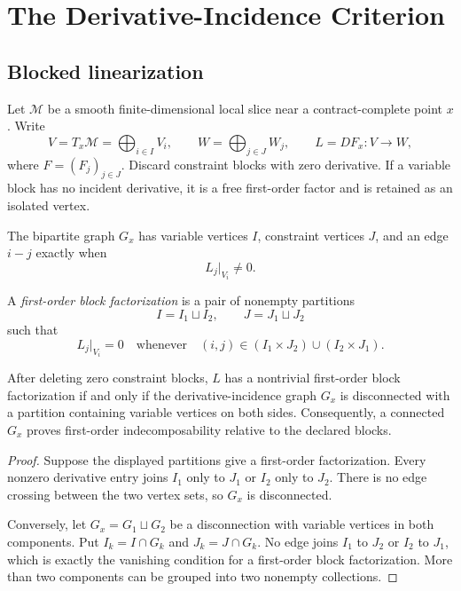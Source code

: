 \documentclass[11pt]{article}
\newcommand{\Mod}{\mathcal M}
\begin{document}
\section{The Derivative-Incidence Criterion}

\subsection{Blocked linearization}

Let $\Mod$ be a smooth finite-dimensional local slice near a
contract-complete point $x$.  Write
\[
 V=T_x\Mod=\bigoplus_{i\in I}V_i,
 \qquad
 W=\bigoplus_{j\in J}W_j,
 \qquad
 L=DF_x:V\longrightarrow W,
\]
where $F=(F_j)_{j\in J}$.  Discard constraint blocks with zero derivative.
If a variable block has no incident derivative, it is a free first-order
factor and is retained as an isolated vertex.

\begin{definition}
The bipartite graph $G_x$ has variable vertices $I$, constraint vertices $J$,
and an edge $i\!-\!j$ exactly when
\[
 L_j|_{V_i}\ne 0.
\]
\end{definition}

\begin{definition}
A \emph{first-order block factorization} is a pair of nonempty partitions
\[
 I=I_1\sqcup I_2,
 \qquad
 J=J_1\sqcup J_2
\]
such that
\[
 L_j|_{V_i}=0
 \quad\text{whenever}\quad
 (i,j)\in(I_1\times J_2)\cup(I_2\times J_1).
\]
\end{definition}

\begin{theorem}\label{thm:incidence}
After deleting zero constraint blocks, $L$ has a nontrivial first-order block
factorization if and only if the derivative-incidence graph $G_x$ is
disconnected with a partition containing variable vertices on both sides.
Consequently, a connected $G_x$ proves first-order indecomposability relative
to the declared blocks.
\end{theorem}

\begin{proof}
Suppose the displayed partitions give a first-order factorization.  Every
nonzero derivative entry joins $I_1$ only to $J_1$ or $I_2$ only to $J_2$.
There is no edge crossing between the two vertex sets, so $G_x$ is
disconnected.

Conversely, let $G_x=G_1\sqcup G_2$ be a disconnection with variable vertices
in both components.  Put $I_k=I\cap G_k$ and $J_k=J\cap G_k$.  No edge joins
$I_1$ to $J_2$ or $I_2$ to $J_1$, which is exactly the vanishing condition for
a first-order block factorization.  More than two components can be grouped
into two nonempty collections.
\end{proof}
\end{document}
